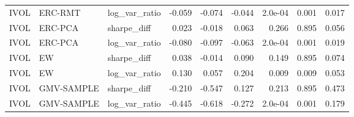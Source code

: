 \begin{table}[t]
{\begin{tabular}{lllrrrrrr}
IVOL & ERC-RMT & log\_var\_ratio & -0.059 & -0.074 & -0.044 & 2.0e-04 & 0.001 & 0.017 \\
IVOL & ERC-PCA & sharpe\_diff & 0.023 & -0.018 & 0.063 & 0.266 & 0.895 & 0.056 \\
IVOL & ERC-PCA & log\_var\_ratio & -0.080 & -0.097 & -0.063 & 2.0e-04 & 0.001 & 0.019 \\
IVOL & EW & sharpe\_diff & 0.038 & -0.014 & 0.090 & 0.149 & 0.895 & 0.074 \\
IVOL & EW & log\_var\_ratio & 0.130 & 0.057 & 0.204 & 0.009 & 0.009 & 0.053 \\
IVOL & GMV-SAMPLE & sharpe\_diff & -0.210 & -0.547 & 0.127 & 0.213 & 0.895 & 0.473 \\
IVOL & GMV-SAMPLE & log\_var\_ratio & -0.445 & -0.618 & -0.272 & 2.0e-04 & 0.001 & 0.179 \\
\bottomrule
\end{tabular}}
\end{table}
